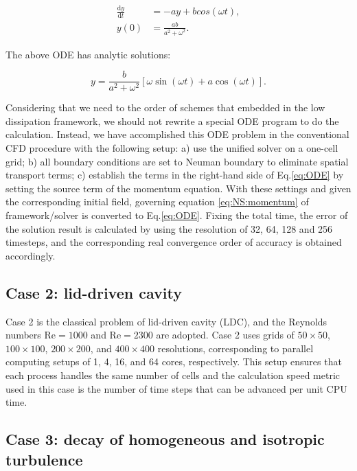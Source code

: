 \documentclass{article}
\begin{document}
\begin{equation}
\label{eq:ODE}
  \begin{aligned}
    \frac{\mathrm{d}y}{\mathrm{d}t} &= -a y + b cos(\omega t),  \\
    y(0) &= \frac{ab}{a^2 + \omega^2}.
  \end{aligned}
\end{equation}

The above ODE has analytic solutions:

\begin{equation}
  y = \frac{b}{a^2 + \omega^2} [\omega \sin(\omega t) + a \cos(\omega t)].
\end{equation}

Considering that we need to the order of schemes that embedded in the low dissipation framework, we should not rewrite a special ODE program to do the calculation. Instead, we have accomplished this ODE problem in the conventional CFD procedure with the following setup: a) use the unified solver on a one-cell grid; b) all boundary conditions are set to Neuman boundary to eliminate spatial transport terms; c) establish the terms in the right-hand side of Eq.\eqref{eq:ODE} by setting the source term of the momentum equation. With these settings and given the corresponding initial field, governing equation \eqref{eq:NS:momentum} of framework/solver is converted to Eq.\eqref{eq:ODE}. Fixing the total time, the error of the solution result is calculated by using the resolution of 32, 64, 128 and 256 timesteps, and the corresponding real convergence order of accuracy is obtained accordingly.


\subsection{Case 2: lid-driven cavity}

Case 2 is the classical problem of lid-driven cavity (LDC), and the Reynolds numbers $\mathrm{Re} = 1000$ and $\mathrm{Re} = 2300$ are adopted. Case 2 uses grids of $50 \times 50$, $100 \times 100$, $200 \times 200$, and $400 \times 400$ resolutions, corresponding to parallel computing setups of 1, 4, 16, and 64 cores, respectively. This setup ensures that each process handles the same number of cells and the calculation speed metric used in this case is the number of time steps that can be advanced per unit CPU time.


\subsection{Case 3: decay of homogeneous and isotropic turbulence}
\end{document}
